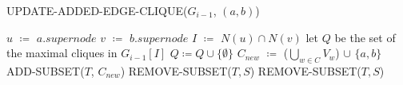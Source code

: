 \begin{algorithm}[H]
    \caption{UPDATE-ADDED-EDGE-CLIQUE($G_{i-1}$, $(a, b)$)}
    \begin{algorithmic}[1]
        \State $u$ $\coloneqq$ $a.supernode$
	\State $v$ $\coloneqq$ $b.supernode$
	\State $I$ $\coloneqq$ $N(u) \cap N(v)$
	\State let $Q$ be the set of the maximal cliques in $G_{i-1}[I]$
        \State $Q \coloneqq Q \cup \{\emptyset\}$
    \EndIf
		\State $C_{new}$ $\coloneqq$ ($\bigcup_{w\in C} V_w$) $\cup$ $\{a, b\}$
		\State ADD-SUBSET($T$, $C_{new}$)
	\EndFor
				\State REMOVE-SUBSET($T,S$)
			\EndIf
		\EndFor
	\EndIf
				\State REMOVE-SUBSET($T,S$)
			\EndIf
		\EndFor
	\EndIf
    \end{algorithmic}\label{alg:algorithm}
\end{algorithm}
